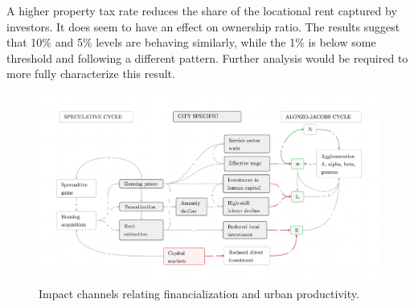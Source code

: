 A higher property tax rate reduces the share of the locational rent captured by investors. %
It does seem to have an effect on ownership ratio. The results suggest that 10\%  and 5\% levels are behaving similarly, while the 1\% is below some threshold and following a different pattern. Further analysis would be required to more fully characterize this result.





\begin{figure}[h!tb]\label{fig-impact-channels2}
\begin{adjustwidth}{-0.24\textwidth}{-0.24\textwidth}
\centering
\includegraphics[scale=.15 ]{fig/impact-channels.png}%
\end{adjustwidth}
\caption[Impact channels relating financialization and urban productivity]{Impact channels relating financialization and urban productivity.}
\end{figure}


